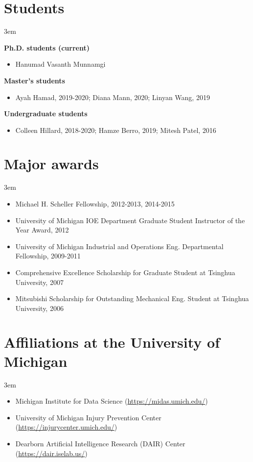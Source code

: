 \documentclass[11pt]{article}
\newenvironment{main}
{\begin{adjustwidth}{3em}{}}
{\end{adjustwidth}}
\begin{document}
\section*{Students}
\begin{main}

\textbf{Ph.D. students (current)}
\begin{itemize}
    \item Hanumad Vasanth Munnamgi
\end{itemize}

\textbf{Master’s students}
\begin{itemize}
    \item Ayah Hamad, 2019-2020; Diana Mann, 2020; Linyan Wang, 2019
\end{itemize}

\textbf{Undergraduate students}
\begin{itemize}
    \item Colleen Hillard, 2018-2020; Hamze Berro, 2019; Mitesh Patel, 2016
\end{itemize}


\end{main}
\section*{Major awards}
\begin{main}

\begin{itemize}
    \item Michael H. Scheller Fellowship, 2012-2013, 2014-2015
    \item University of Michigan IOE Department Graduate Student Instructor of the Year Award, 2012
    \item University of Michigan Industrial and Operations Eng. Departmental Fellowship, 2009-2011
    \item Comprehensive Excellence Scholarship for Graduate Student at Tsinghua University, 2007
    \item Mitsubishi Scholarship for Outstanding Mechanical Eng. Student at Tsinghua University, 2006
\end{itemize}


\end{main}
\section*{Affiliations at the University of Michigan}
\begin{main}

\begin{itemize}
    \item Michigan Institute for Data Science (\url{https://midas.umich.edu/})
    \item University of Michigan Injury Prevention Center (\url{https://injurycenter.umich.edu/})
    \item Dearborn Artificial Intelligence Research (DAIR) Center (\url{https://dair.iselab.us/})
\end{itemize}


\end{main}
\end{document}
